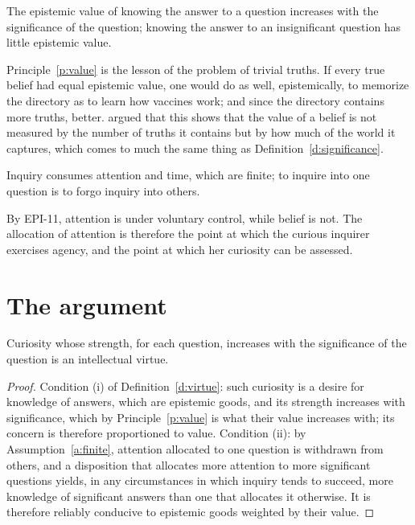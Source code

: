 \documentclass{situationist-preprint}
\begin{document}
\begin{principle}\label{p:value}
The epistemic value of knowing the answer to a question increases with the significance of the question; knowing the answer to an insignificant question has little epistemic value.
\end{principle}

Principle~\ref{p:value} is the lesson of the problem of trivial truths. If every true belief had equal epistemic value, one would do as well, epistemically, to memorize the directory as to learn how vaccines work; and since the directory contains more truths, better. \citet{Treanor2013} argued that this shows that the value of a belief is not measured by the number of truths it contains but by how much of the world it captures, which comes to much the same thing as Definition~\ref{d:significance}.

\begin{assumption}\label{a:finite}
Inquiry consumes attention and time, which are finite; to inquire into one question is to forgo inquiry into others.
\end{assumption}

By EPI-11, attention is under voluntary control, while belief is not. The allocation of attention is therefore the point at which the curious inquirer exercises agency, and the point at which her curiosity can be assessed.

\section{The argument}

\begin{theorem}\label{t:virtue}
Curiosity whose strength, for each question, increases with the significance of the question is an intellectual virtue.
\end{theorem}

\begin{proof}
Condition (i) of Definition~\ref{d:virtue}: such curiosity is a desire for knowledge of answers, which are epistemic goods, and its strength increases with significance, which by Principle~\ref{p:value} is what their value increases with; its concern is therefore proportioned to value. Condition (ii): by Assumption~\ref{a:finite}, attention allocated to one question is withdrawn from others, and a disposition that allocates more attention to more significant questions yields, in any circumstances in which inquiry tends to succeed, more knowledge of significant answers than one that allocates it otherwise. It is therefore reliably conducive to epistemic goods weighted by their value.
\end{proof}
\end{document}
